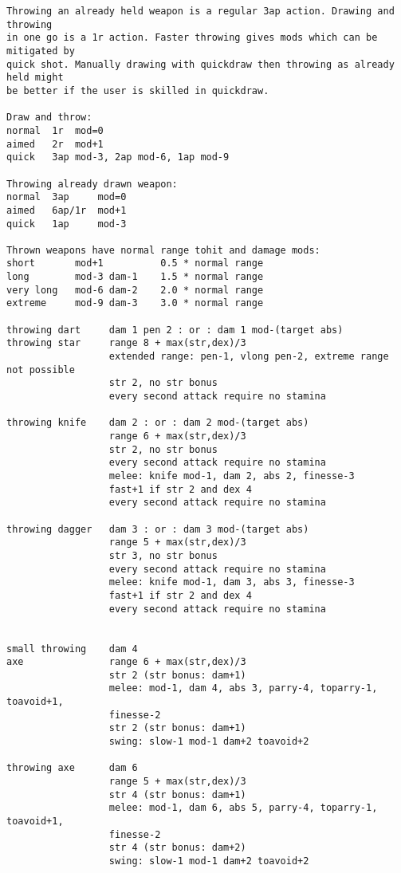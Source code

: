 \small \begin{verbatim}
Throwing an already held weapon is a regular 3ap action. Drawing and throwing 
in one go is a 1r action. Faster throwing gives mods which can be mitigated by 
quick shot. Manually drawing with quickdraw then throwing as already held might 
be better if the user is skilled in quickdraw.

Draw and throw:
normal  1r  mod=0
aimed   2r  mod+1
quick   3ap mod-3, 2ap mod-6, 1ap mod-9

Throwing already drawn weapon:
normal  3ap     mod=0
aimed   6ap/1r  mod+1
quick   1ap     mod-3

Thrown weapons have normal range tohit and damage mods:
short       mod+1          0.5 * normal range
long        mod-3 dam-1    1.5 * normal range
very long   mod-6 dam-2    2.0 * normal range
extreme     mod-9 dam-3    3.0 * normal range

throwing dart     dam 1 pen 2 : or : dam 1 mod-(target abs)
throwing star     range 8 + max(str,dex)/3
                  extended range: pen-1, vlong pen-2, extreme range not possible
                  str 2, no str bonus
                  every second attack require no stamina

throwing knife    dam 2 : or : dam 2 mod-(target abs)
                  range 6 + max(str,dex)/3
                  str 2, no str bonus
                  every second attack require no stamina
                  melee: knife mod-1, dam 2, abs 2, finesse-3
                  fast+1 if str 2 and dex 4
                  every second attack require no stamina

throwing dagger   dam 3 : or : dam 3 mod-(target abs)
                  range 5 + max(str,dex)/3
                  str 3, no str bonus
                  every second attack require no stamina
                  melee: knife mod-1, dam 3, abs 3, finesse-3
                  fast+1 if str 2 and dex 4
                  every second attack require no stamina


small throwing    dam 4
axe               range 6 + max(str,dex)/3
                  str 2 (str bonus: dam+1)
                  melee: mod-1, dam 4, abs 3, parry-4, toparry-1, toavoid+1, 
                  finesse-2
                  str 2 (str bonus: dam+1)
                  swing: slow-1 mod-1 dam+2 toavoid+2

throwing axe      dam 6
                  range 5 + max(str,dex)/3
                  str 4 (str bonus: dam+1)
                  melee: mod-1, dam 6, abs 5, parry-4, toparry-1, toavoid+1, 
                  finesse-2
                  str 4 (str bonus: dam+2)
                  swing: slow-1 mod-1 dam+2 toavoid+2


\end{verbatim}

